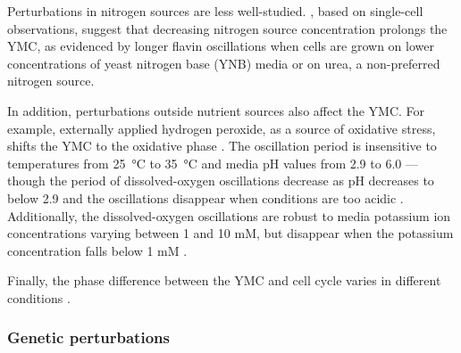 Perturbations in nitrogen sources are less well-studied.
\textcite{baumgartnerFlavinbasedMetabolicCycles2018}, based on single-cell observations, suggest that decreasing nitrogen source concentration prolongs the YMC, as evidenced by longer flavin oscillations when cells are grown on lower concentrations of yeast nitrogen base (YNB) media or on urea, a non-preferred nitrogen source.

In addition, perturbations outside nutrient sources also affect the YMC.
For example, externally applied hydrogen peroxide, as a source of oxidative stress, shifts the YMC to the oxidative phase \parencite{amponsahPeroxiredoxinsCoupleMetabolism2021}.
The oscillation period is insensitive to temperatures from \SI{25}{\celsius} to \SI{35}{\celsius} and media pH values from
2.9 to 6.0 \parencite{lloydUltradianMetronomeTimekeeper2005} --- though the period of dissolved-oxygen oscillations decrease as pH decreases to below 2.9 and the oscillations disappear when conditions are too acidic \parencite{oneillEukaryoticCellBiology2020}.
Additionally, the dissolved-oxygen oscillations are robust to media potassium ion concentrations varying between 1 and 10 mM, but disappear when the potassium concentration falls below 1 mM \parencite{oneillEukaryoticCellBiology2020}.

Finally, the phase difference between the YMC and cell cycle varies in different conditions %
\parencite{ewaldYeastCyclinDependentKinase2016}. %

\subsubsection{Genetic perturbations}
\label{subsubsec:intro-ymc-perturbations-genetic}

